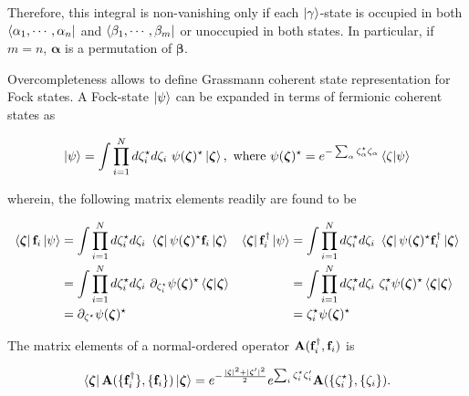 \documentclass{homework}
\begin{document}
\begin{tcolorbox}
Therefore, this integral is non-vanishing only if each $\ket{\gamma}$-state is occupied in both $\bra{\alpha_1, \cdots, \alpha_n}$ and $\bra{\beta_1, \cdots, \beta_m}$ or unoccupied in both states. In particular, if $m = n$, ${\bm \alpha}$ is a permutation of $\bm{\beta}$. 
\end{tcolorbox}

Overcompleteness allows to define Grassmann coherent state representation for Fock states. A Fock-state $\ket{\psi}$ can be expanded in terms of fermionic coherent states as 

$$
\ket{\psi} = \int \prod_{i=1}^{N} d{\zeta}^\star_i d\zeta_i \textnormal{ } \psi({\bm \zeta)^\star} \ket{\bm{\zeta}}, \textnormal{ where } \psi({\bm \zeta)^\star} = e^{- \sum_{\alpha} \zeta^\star_{\alpha} \zeta_\alpha} \bra{\zeta}\ket{\psi} 
$$

wherein, the following matrix elements readily are found to be 

\begin{equation}
\begin{array}{cc}
    \begin{split}
        \bra{\bm{\zeta}} {{\bf f}}_i \ket{\psi} &= \int \prod_{i=1}^{N} d{\zeta}^\star_i d\zeta_i \textnormal{ } \bra{\bm{\zeta}} \psi({\bm \zeta)^\star} {{\bf f}}_i \ket{\bm{\zeta}} \\
        &= \int \prod_{i=1}^{N} d{\zeta}^\star_i d\zeta_i \textnormal{ } \partial_{\zeta_i^\star} \psi({\bm \zeta)^\star} \bra{\bm{\zeta}}\ket{\bm{\zeta}} \\
        &= \partial_{{\zeta^\star}}\psi({\bm \zeta)^\star}
    \end{split} & \begin{split}
         \bra{\bm{\zeta}} {{\bf f}}_i^\dagger \ket{\psi} &= \int \prod_{i=1}^{N} d{\zeta}^\star_i d\zeta_i \textnormal{ } \bra{\bm{\zeta}} \psi({\bm \zeta)^\star} {{\bf f}}_i^\dagger \ket{\bm{\zeta}} \\
        &= \int \prod_{i=1}^{N} d{\zeta}^\star_i d\zeta_i \textnormal{ } {\zeta_i^\star} \psi({\bm \zeta)^\star} \bra{\bm{\zeta}}\ket{\bm{\zeta}} \\
        &= {\zeta_i^\star} \psi({\bm \zeta)^\star}
    \end{split}  \\
   \end{array}  
\end{equation}
   
The matrix elements of a normal-ordered operator ${\bf A}({{{\bf f}}_i^\dagger
}, {{\bf f}}_i)$ is 

$$
\bra{\bm{\zeta}} {{\bf A}}(\{{{\bf f}}_i^\dagger
\}, \{{\bf f}_i\}) \ket{\bm{\zeta}} = e^{-\frac{|\bm{\zeta}|^2 + |\bm{\zeta}'|^2}{2}} e^{\sum_{i} \zeta_i^\star \zeta_i'} {{\bf A}}(\{\zeta_i^\star\}, \{\zeta_i\}).
$$
\end{document}

